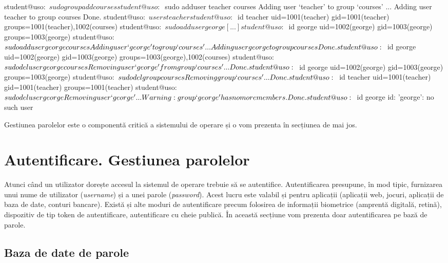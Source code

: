\begin{screen}[caption={Gestiunea utilizatorilor și grupurilor în Linux},label={lst:user:user-group-linux}]
student@uso:~$ sudo groupadd courses
student@uso:~$ sudo adduser teacher courses
Adding user `teacher' to group `courses' ...
Adding user teacher to group courses
Done.
student@uso:~$ users teacher
student@uso:~$ id teacher
uid=1001(teacher) gid=1001(teacher) groups=1001(teacher),1002(courses)
student@uso:~$ sudo adduser george
[...]
student@uso:~$ id george
uid=1002(george) gid=1003(george) groups=1003(george)
student@uso:~$ sudo adduser george courses
Adding user `george' to group `courses' ...
Adding user george to group courses
Done.
student@uso:~$ id george
uid=1002(george) gid=1003(george) groups=1003(george),1002(courses)
student@uso:~$ sudo deluser george courses
Removing user `george' from group `courses' ...
Done.
student@uso:~$ id george
uid=1002(george) gid=1003(george) groups=1003(george)
student@uso:~$ sudo delgroup courses
Removing group `courses' ...
Done.
student@uso:~$ id teacher
uid=1001(teacher) gid=1001(teacher) groups=1001(teacher)
student@uso:~$ sudo deluser george
Removing user `george' ...
Warning: group `george' has no more members.
Done.
student@uso:~$ id george
id: 'george': no such user
\end{screen}

Gestiunea parolelor este o componentă critică a sistemului de operare și o vom prezenta în secțiunea de mai jos.

\section{Autentificare. Gestiunea parolelor}
\label{sec:user:auth}

Atunci când un utilizator dorește accesul la sistemul de operare trebuie să se autentifice.
Autentificarea presupune, în mod tipic, furnizarea unui nume de utilizator (\textit{username}) și a unei parole (\textit{password}).
Acest lucru este valabil și pentru aplicații (aplicații web, jocuri, aplicații de baza de date, conturi bancare).
Există și alte moduri de autentificare precum folosirea de informații biometrice (amprentă digitală, retină), dispozitiv de tip token de autentificare, autentificare cu cheie publică.
În această secțiune vom prezenta doar autentificarea pe bază de parole.

\subsection{Baza de date de parole}
\label{sec:user:password-db}

